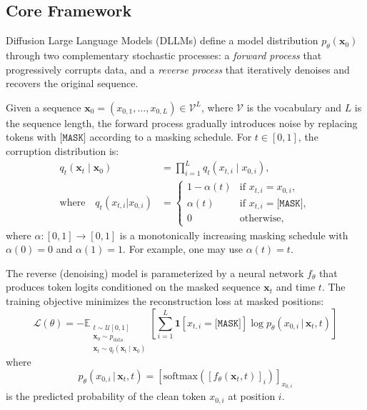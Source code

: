     \subsection{Core Framework}

    Diffusion Large Language Models (DLLMs) define a model distribution $p_\theta(\mathbf{x}_0)$ through two complementary stochastic processes: a \textit{forward process} that progressively corrupts data, and a \textit{reverse process} that iteratively denoises and recovers the original sequence.

    Given a sequence $\mathbf{x}_0 = (x_{0,1}, \dots, x_{0,L}) \in \mathcal{V}^L$, where $\mathcal{V}$ is the vocabulary and $L$ is the sequence length, the forward process gradually introduces noise by replacing tokens with $\texttt{[MASK]}$ according to a masking schedule. For $t \in [0,1]$, the corruption distribution is:
    \begin{equation}
    \begin{split}
        q_t(\mathbf{x}_t \mid \mathbf{x}_0) &= \prod_{i=1}^L q_t(x_{t,i} \mid x_{0,i}), \\
        \text{where} \quad q_t(x_{t,i} | x_{0,i}) &= 
        \begin{cases}
            1 - \alpha(t) & \text{if } x_{t,i} = x_{0,i}, \\
            \alpha(t)    & \text{if } x_{t,i} = \texttt{[MASK]}, \\
            0            & \text{otherwise},
        \end{cases}
    \end{split}
    \label{eq:forward}
    \end{equation}
    where $\alpha: [0,1] \to [0,1]$ is a monotonically increasing masking schedule with $\alpha(0) = 0$ and $\alpha(1) = 1$. For example, one may use $\alpha(t)=t$.

    The reverse (denoising) model is parameterized by a neural network $f_\theta$ that produces token logits conditioned on the masked sequence $\mathbf{x}_t$ and time $t$. The training objective minimizes the reconstruction loss at masked positions:
    \begin{equation}
        \mathcal{L}(\theta) = -\mathbb{E}_{\substack{t \sim \mathcal{U}[0,1] \\ \mathbf{x}_0 \sim p_{\text{data}} \\ \mathbf{x}_t \sim q_t(\mathbf{x}_t \mid \mathbf{x}_0)}} \left[ \sum_{i=1}^L \mathbf{1}\!\left[x_{t,i} = \texttt{[MASK]}\right] \log p_\theta(x_{0,i} \,|\, \mathbf{x}_t, t) \right]
        \label{eq:loss}
    \end{equation}
    where
    \begin{equation}
        p_\theta(x_{0,i} \,|\, \mathbf{x}_t, t)
        =
        \left[\mathrm{softmax}([f_\theta(\mathbf{x}_t, t)]_i)\right]_{x_{0,i}}
    \end{equation}
    is the predicted probability of the clean token $x_{0,i}$ at position $i$.

